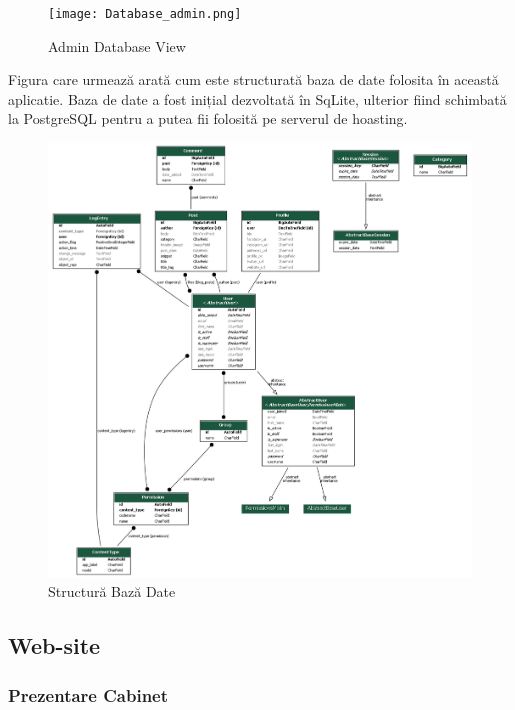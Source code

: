 \documentclass[11pt]{scrartcl} %
\begin{document}
\begin{figure}[h] %
	\centering
	\texttt{[image: Database\_admin.png]} %
	\caption{Admin Database View}
\end{figure}

Figura care urmează arată cum este structurată baza de date folosita în această aplicatie. Baza de date a fost inițial dezvoltată în SqLite, ulterior fiind schimbată la PostgreSQL pentru a putea fii folosită pe serverul de hoasting. 

\begin{figure}[h] %
	\centering
	\includegraphics[width=0.8\columnwidth]{my_project_visualized.png} %
	\caption{Structură Bază Date}
\end{figure}

\subsection{Web-site}


\subsubsection{Prezentare Cabinet}
\end{document}

